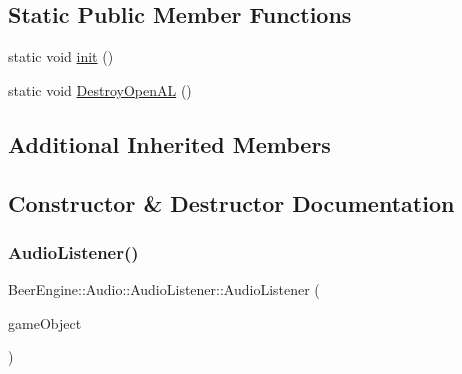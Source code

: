 \subsection*{Static Public Member Functions}
\begin{DoxyCompactItemize}
\item 
static void \mbox{\hyperlink{class_beer_engine_1_1_audio_1_1_audio_listener_ab5d881529114f89d6d01a043f84fc14e}{init}} ()
\item 
static void \mbox{\hyperlink{class_beer_engine_1_1_audio_1_1_audio_listener_acff5f055ac723e3842beb7bc9c7483c6}{Destroy\+Open\+AL}} ()
\end{DoxyCompactItemize}
\subsection*{Additional Inherited Members}


\subsection{Constructor \& Destructor Documentation}
\mbox{\label{class_beer_engine_1_1_audio_1_1_audio_listener_a7f652b4e6cd4df8038630081fa475d62}} 
\subsubsection{\texorpdfstring{Audio\+Listener()}{AudioListener()}}
{\footnotesize\ttfamily Beer\+Engine\+::\+Audio\+::\+Audio\+Listener\+::\+Audio\+Listener (\begin{DoxyParamCaption}\item[{\mbox{\hyperlink{class_beer_engine_1_1_game_object}{Beer\+Engine\+::\+Game\+Object}} $\ast$}]{game\+Object }\end{DoxyParamCaption})}

\mbox{\label{class_beer_engine_1_1_audio_1_1_audio_listener_a7fb8733754e4c09b5a32792b3beb78b1}} 
